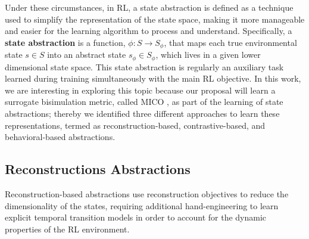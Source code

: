 Under these circumstances, in RL, a state abstraction is defined as a technique used to simplify the representation of the state space, making it more manageable and easier for the learning algorithm to process and understand. Specifically, a \textbf{state abstraction} \cite{abel2022theory} is a function, $\phi : S \rightarrow S_\phi$, that maps each true environmental state $s \in S$ into an abstract state $s_\phi \in S_\phi$, which lives in a given lower dimensional state space. This state abstraction is regularly an auxiliary task learned during training simultaneously with the main RL objective. In this work, we are interesting in exploring this topic because our proposal will learn a surrogate bisimulation metric, called MICO \cite{castro2021mico}, as part of the learning of state abstractions; thereby we identified three different approaches to learn these representations, termed as reconstruction-based, contrastive-based, and behavioral-based abstractions.


\subsection{Reconstructions Abstractions}

Reconstruction-based abstractions use reconstruction objectives to reduce the dimensionality of the states, requiring additional hand-engineering to learn explicit temporal transition models in order to account for the dynamic properties of the RL environment. 


